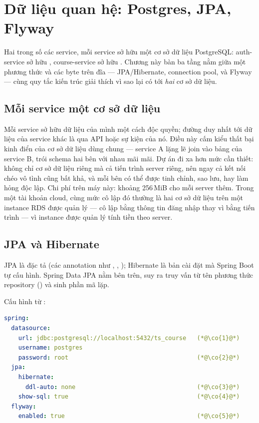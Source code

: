 \chapter{Dữ liệu quan hệ: Postgres, JPA, Flyway}
\label{ch:postgres}

Hai trong số các service, mỗi service sở hữu một cơ sở dữ liệu
PostgreSQL: auth-service sở hữu , course-service sở hữu
. Chương này bàn ba tầng nằm giữa một phương thức
 và các byte trên đĩa --- JPA/Hibernate, connection pool,
và Flyway --- cùng quy tắc kiến trúc giải thích vì sao lại có tới
\emph{hai} cơ sở dữ liệu.

\section{Mỗi service một cơ sở dữ liệu}

\begin{decision}
Mỗi service sở hữu dữ liệu của mình một cách độc quyền; đường duy nhất
tới dữ liệu của service khác là qua API hoặc sự kiện của nó. Điều này
cấm kiểu thất bại kinh điển của cơ sở dữ liệu dùng chung --- service A
lặng lẽ join vào bảng của service B, trói schema hai bên với nhau mãi
mãi. Dự án đi xa hơn mức cần thiết: không chỉ cơ sở dữ liệu riêng mà
cả tiến trình server riêng, nên ngay cả kết nối chéo vô tình cũng bất
khả, và mỗi bên có thể được tinh chỉnh, sao lưu, hay làm hỏng độc lập.
Chi phí trên máy này: khoảng 256\,MiB cho mỗi server thêm. Trong một
tài khoản cloud, cùng mức cô lập đó thường là hai cơ sở dữ liệu trên
một instance RDS được quản lý --- cô lập bằng thông tin đăng nhập thay
vì bằng tiến trình --- vì instance được quản lý tính tiền theo server.
\end{decision}

\section{JPA và Hibernate}

JPA là đặc tả (các annotation như ,
, ); Hibernate là bản cài đặt mà
Spring Boot tự cấu hình. Spring Data JPA nằm bên trên, suy ra truy vấn
từ tên phương thức repository () và
sinh phần mã lặp.

Cấu hình từ :

\begin{lstlisting}[language=yaml]
spring:
  datasource:
    url: jdbc:postgresql://localhost:5432/ts_course   (*@\co{1}@*)
    username: postgres
    password: root                                    (*@\co{2}@*)
  jpa:
    hibernate:
      ddl-auto: none                                  (*@\co{3}@*)
    show-sql: true                                    (*@\co{4}@*)
  flyway:
    enabled: true                                     (*@\co{5}@*)
\end{lstlisting}

